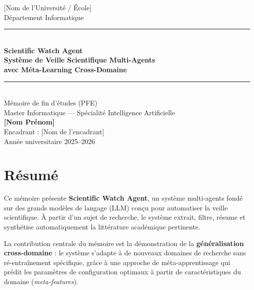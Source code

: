 \documentclass[12pt,a4paper,twoside]{report}
\begin{document}
\begin{titlepage}
  \centering
  \vspace*{1cm}
  {\Large [Nom de l'Université / École]}\\[0.5cm]
  {\large Département Informatique}\\[2cm]

  \rule{\textwidth}{1.5pt}\\[0.4cm]
  {\LARGE\bfseries Scientific Watch Agent}\\[0.3cm]
  {\Large\bfseries Système de Veille Scientifique Multi-Agents\\
  avec Méta-Learning Cross-Domaine}\\[0.3cm]
  \rule{\textwidth}{1.5pt}\\[2cm]

  {\large Mémoire de fin d'études (PFE)\\
  Master Informatique — Spécialité Intelligence Artificielle}\\[2cm]

  {\large\bfseries [Nom Prénom]}\\[1cm]
  {\large Encadrant : [Nom de l'encadrant]}\\[2cm]

  {\large Année universitaire 2025--2026}
  \vfill
\end{titlepage}

\chapter*{Résumé}

Ce mémoire présente \textbf{Scientific Watch Agent}, un système multi-agents fondé
sur des grands modèles de langage (LLM) conçu pour automatiser la veille scientifique.
À partir d'un sujet de recherche, le système extrait, filtre, résume et synthétise
automatiquement la littérature académique pertinente.

La contribution centrale du mémoire est la démonstration de la \textbf{généralisation
cross-domaine} : le système s'adapte à de nouveaux domaines de recherche sans
ré-entraînement spécifique, grâce à une approche de méta-apprentissage qui prédit
les paramètres de configuration optimaux à partir de caractéristiques du domaine
(\textit{meta-features}).
\end{document}
